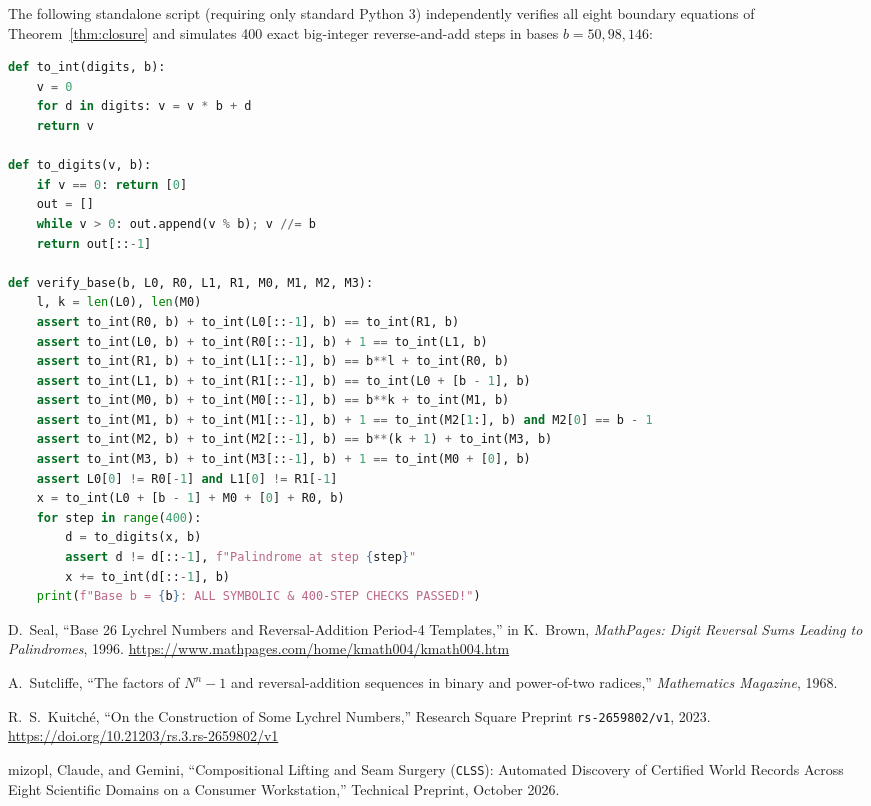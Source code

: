 \documentclass[11pt,a4paper]{article}
\theoremstyle{definition}
\theoremstyle{remark}
\begin{document}
The following standalone script (requiring only standard Python 3) independently verifies all eight boundary equations of Theorem~\ref{thm:closure} and simulates 400 exact big-integer reverse-and-add steps in bases $b = 50, 98, 146$:

\begin{lstlisting}[language=Python]
def to_int(digits, b):
    v = 0
    for d in digits: v = v * b + d
    return v

def to_digits(v, b):
    if v == 0: return [0]
    out = []
    while v > 0: out.append(v % b); v //= b
    return out[::-1]

def verify_base(b, L0, R0, L1, R1, M0, M1, M2, M3):
    l, k = len(L0), len(M0)
    assert to_int(R0, b) + to_int(L0[::-1], b) == to_int(R1, b)
    assert to_int(L0, b) + to_int(R0[::-1], b) + 1 == to_int(L1, b)
    assert to_int(R1, b) + to_int(L1[::-1], b) == b**l + to_int(R0, b)
    assert to_int(L1, b) + to_int(R1[::-1], b) == to_int(L0 + [b - 1], b)
    assert to_int(M0, b) + to_int(M0[::-1], b) == b**k + to_int(M1, b)
    assert to_int(M1, b) + to_int(M1[::-1], b) + 1 == to_int(M2[1:], b) and M2[0] == b - 1
    assert to_int(M2, b) + to_int(M2[::-1], b) == b**(k + 1) + to_int(M3, b)
    assert to_int(M3, b) + to_int(M3[::-1], b) + 1 == to_int(M0 + [0], b)
    assert L0[0] != R0[-1] and L1[0] != R1[-1]
    x = to_int(L0 + [b - 1] + M0 + [0] + R0, b)
    for step in range(400):
        d = to_digits(x, b)
        assert d != d[::-1], f"Palindrome at step {step}"
        x += to_int(d[::-1], b)
    print(f"Base b = {b}: ALL SYMBOLIC & 400-STEP CHECKS PASSED!")
\end{lstlisting}

\begin{thebibliography}{9}
D.~Seal, ``Base 26 Lychrel Numbers and Reversal-Addition Period-4 Templates,'' in K.~Brown, \emph{MathPages: Digit Reversal Sums Leading to Palindromes}, 1996. \url{https://www.mathpages.com/home/kmath004/kmath004.htm}

A.~Sutcliffe, ``The factors of $N^n - 1$ and reversal-addition sequences in binary and power-of-two radices,'' \emph{Mathematics Magazine}, 1968.

R.~S.~Kuitch\'{e}, ``On the Construction of Some Lychrel Numbers,'' Research Square Preprint \texttt{rs-2659802/v1}, 2023. \url{https://doi.org/10.21203/rs.3.rs-2659802/v1}

mizopl, Claude, and Gemini, ``Compositional Lifting and Seam Surgery (\texttt{CLSS}): Automated Discovery of Certified World Records Across Eight Scientific Domains on a Consumer Workstation,'' Technical Preprint, October 2026.
\end{thebibliography}
\end{document}
